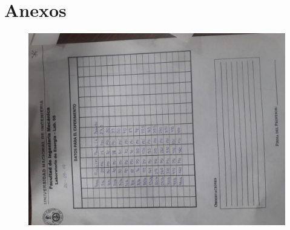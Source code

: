 \documentclass[a4paper,12pt]{report}
\begin{document}
\chapter*{Anexos}
\begin{figure}[H]
\centering
\includegraphics[angle=-90,scale=0.5]{datos.jpeg}
\end{figure}
\end{document}
